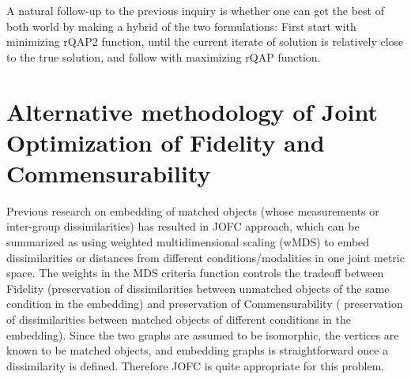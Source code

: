 \documentclass[12pt]{article}
\begin{document}
A natural follow-up to the previous inquiry is whether one can get the best of both world by making a hybrid of the two formulations: First start with minimizing rQAP2 function, until the current iterate of solution is relatively close to the true solution, and follow with maximizing rQAP function. 

 \section{Alternative methodology of Joint Optimization of Fidelity and Commensurability}
Previous research on embedding of matched objects (whose measurements or  inter-group dissimilarities) has resulted in JOFC approach, which can be summarized as using weighted multidimensional scaling (wMDS) to embed dissimilarities or distances from different conditions/modalities in one joint metric space. The weights in the MDS criteria function controls the tradeoff between  Fidelity (preservation of dissimilarities between unmatched objects of the same condition in the embedding) and preservation of Commensurability  ( preservation of dissimilarities between matched objects of different conditions in the embedding). Since the two graphs are assumed to be isomorphic, the vertices are known to be  matched objects, and embedding graphs is straightforward once a dissimilarity is defined. Therefore JOFC is quite appropriate for this problem. 
\end{document}
